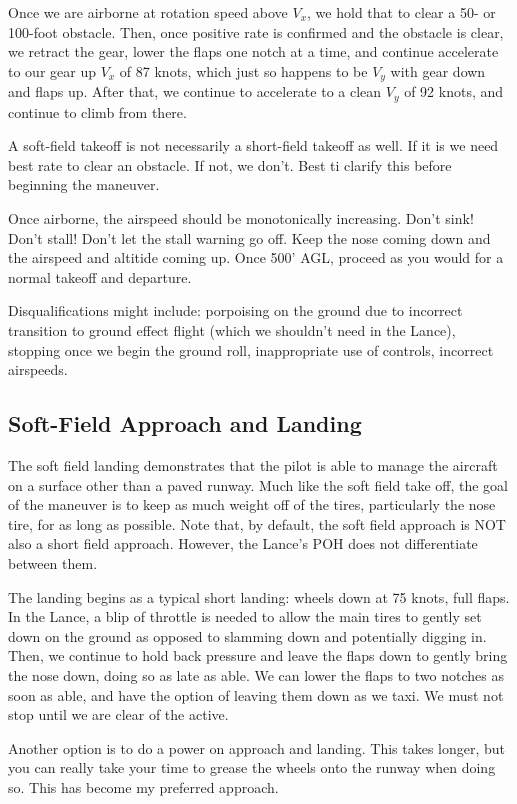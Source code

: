 Once we are airborne at rotation speed above $V_x$, we hold that to clear a 50- or 100-foot obstacle. Then, once positive rate is confirmed and the obstacle is clear, we retract the gear, lower the flaps one notch at a time, and continue accelerate to our gear up $V_x$ of 87 knots, which just so happens to be $V_y$ with gear down and flaps up. After that, we continue to accelerate to a clean $V_y$ of 92 knots, and continue to climb from there.

A soft-field takeoff is not necessarily a short-field takeoff as well. If it is we need best rate to clear an obstacle. If not, we don't. Best ti clarify this before beginning the maneuver.

Once airborne, the airspeed should be monotonically increasing. Don't sink! Don't stall! Don't let the stall warning go off. Keep the nose coming down and the airspeed and altitide coming up. Once 500' AGL, proceed as you would for a normal takeoff and departure.

Disqualifications might include: porpoising on the ground due to incorrect transition to ground effect flight (which we shouldn't need in the Lance), stopping once we begin the ground roll, inappropriate use of controls, incorrect airspeeds.

\subsection{Soft-Field Approach and Landing}

The soft field landing demonstrates that the pilot is able to manage the aircraft on a surface other than a paved runway. Much like the soft field take off, the goal of the maneuver is to keep as much weight off of the tires, particularly the nose tire, for as long as possible. Note that, by default, the soft field approach is NOT also a short field approach. However, the Lance's POH does not differentiate between them.

The landing begins as a typical short landing: wheels down at 75 knots, full flaps. In the Lance, a blip of throttle is needed to allow the main tires to gently set down on the ground as opposed to slamming down and potentially digging in. Then, we continue to hold back pressure and leave the flaps down to gently bring the nose down, doing so as late as able. We can lower the flaps to two notches as soon as able, and have the option of leaving them down as we taxi. We must not stop until we are clear of the active.

Another option is to do a power on approach and landing. This takes longer, but you can really take your time to grease the wheels onto the runway when doing so. This has become my preferred approach.

